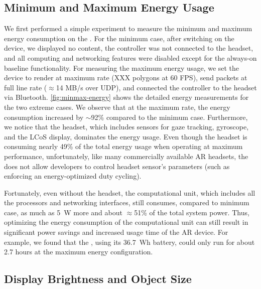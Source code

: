 
\subsection{Minimum and Maximum Energy Usage}

We first performed a simple experiment to measure the minimum and maximum energy consumption on the \mlo. For the minimum case, after switching on the device, we displayed no content, the controller was not connected to the headset, and all computing and networking features were disabled except for the always-on baseline functionality. For measuring the maximum energy usage, we set the device to render at maximum rate (XXX polygons at 60 FPS), send packets at full line rate ($\approx$14 MB/s over UDP), and connected the controller to the headset via Bluetooth. \fig\ref{fig:minmax-energy} shows the detailed energy measurements for the two extreme cases. We observe that at the maximum rate, the energy consumption increased by $\sim$92\% compared to the minimum case.
%
Furthermore, we notice that the headset, which includes sensors for gaze tracking, gyroscope, and the LCoS display, dominates the energy usage. %
Even though the headset is consuming nearly 49\% of the total energy usage when operating at maximum performance, unfortunately, like many commercially available AR headsets, the {\mlo} does not allow developers to control headset sensor's parameters (such as enforcing an energy-optimized duty cycling).

Fortunately, even without the headset, the computational unit, which includes all the processors and networking interfaces, still consumes, compared to minimum case, as much as 5~W more and about $\approx$51\% of the total system power. Thus, optimizing the energy consumption of the computational unit can still result in significant power savings and increased usage time of the AR device. For example, we found that the {\mlo}, using its 36.7~Wh battery, could only run for about 2.7 hours at the maximum energy configuration. 



\subsection{Display Brightness and Object Size}


